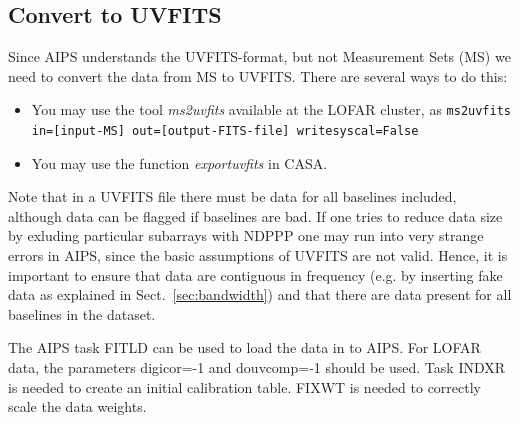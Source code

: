\documentclass[graybox]{svmult}
\begin{document}


\subsection{Convert to UVFITS}

Since AIPS understands the UVFITS-format, but not Measurement Sets (MS)
we need to convert the data from MS to UVFITS. There are several ways to do this:
\begin{itemize}
\item You may use the tool \emph{ms2uvfits} available at the LOFAR cluster, as {\tt ms2uvfits in=[input-MS] out=[output-FITS-file] writesyscal=False}
\item You may use the function \emph{exportuvfits} in CASA.
\end{itemize}
Note that in a UVFITS file there must be data for all baselines included,
although data can be flagged if baselines are bad. If one tries to reduce data
size by exluding particular subarrays with NDPPP one may run into very strange
errors in AIPS, since the basic assumptions of UVFITS are not valid.  Hence, it
is important to ensure that data are contiguous in frequency (e.g. by inserting
fake data as explained in Sect.~\ref{sec:bandwidth}) and that there are data
present for all baselines in the dataset. 

The AIPS task FITLD can be used to load the data in to AIPS. For LOFAR data,
the parameters digicor=-1 and douvcomp=-1 should be used. Task INDXR is needed
to create an initial calibration table. FIXWT is needed to correctly scale the
data weights.
\end{document}

